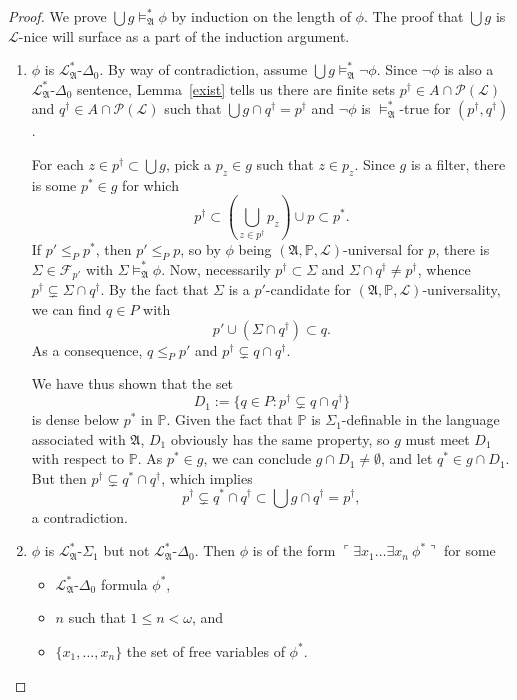 \documentclass[12pt, twoside]{memoir}
\numberwithin{equation}{section}
\theoremstyle{definition}
\theoremstyle{remark}
\theoremstyle{definition}
\theoremstyle{definition}
\theoremstyle{definition}
\theoremstyle{remark}
\begin{document}
\begin{proof}
We prove $\bigcup g \models^{*}_{\mathfrak{A}} \phi$ by induction on the length of $\phi$. The proof that $\bigcup g$ is $\mathcal{L}$-nice will surface as a part of the induction argument.
\begin{enumerate}[label=Case \arabic*:, leftmargin=50pt]
    \item\label{526c1} $\phi$ is $\mathcal{L}^{*}_{\mathfrak{A}}$-$\Delta_0$. By way of contradiction, assume $\bigcup g \models^{*}_{\mathfrak{A}} \neg \phi$. Since $\neg \phi$ is also a $\mathcal{L}^{*}_{\mathfrak{A}}$-$\Delta_0$ sentence, Lemma~\ref{exist} tells us there are finite sets $p^{\dagger} \in A \cap \mathcal{P}(\mathcal{L})$ and $q^{\dagger} \in A \cap \mathcal{P}(\mathcal{L})$ such that $\bigcup g \cap q^{\dagger} = p^{\dagger}$ and $\neg \phi$ is $\models^{*}_{\mathfrak{A}}$-true for $(p^{\dagger}, q^{\dagger})$.

    For each $z \in p^{\dagger} \subset \bigcup g$, pick a $p_z \in g$ such that $z \in p_z$. Since $g$ is a filter, there is some $p^* \in g$ for which $$p^{\dagger} \subset (\bigcup_{z \in p^{\dagger}} p_z) \cup p \subset p^*.$$ If $p' \leq_{P} p^*$, then $p' \leq_{P} p$, so by $\phi$ being $(\mathfrak{A}, \mathbb{P}, \mathcal{L})$-universal for $p$, there is $\Sigma \in \mathcal{F}_{p'}$ with $\Sigma \models^*_{\mathfrak{A}} \phi$. Now, necessarily $p^{\dagger} \subset \Sigma$ and $\Sigma \cap q^{\dagger} \neq p^{\dagger}$, whence $p^{\dagger} \subsetneq \Sigma \cap q^{\dagger}$. By the fact that $\Sigma$ is a $p'$-candidate for $(\mathfrak{A}, \mathbb{P}, \mathcal{L})$-universality, we can find $q \in P$ with $$p' \cup (\Sigma \cap q^{\dagger}) \subset q.$$ As a consequence, $q \leq_P p'$ and $p^{\dagger} \subsetneq q \cap q^{\dagger}$.
    
    We have thus shown that the set $$D_1 := \{q \in P : p^{\dagger} \subsetneq q \cap q^{\dagger}\}$$ is dense below $p^*$ in $\mathbb{P}$. Given the fact that $\mathbb{P}$ is $\Sigma_1$-definable in the language associated with $\mathfrak{A}$, $D_1$ obviously has the same property, so $g$ must meet $D_1$ with respect to $\mathbb{P}$. As $p^* \in g$, we can conclude $g \cap D_1 \neq \emptyset$, and let $q^* \in g \cap D_1$. But then $p^{\dagger} \subsetneq q^* \cap q^{\dagger}$, which implies $$p^{\dagger} \subsetneq q^* \cap q^{\dagger} \subset \bigcup g \cap q^{\dagger} = p^{\dagger},$$ a contradiction. 
    
    \item $\phi$ is $\mathcal{L}^{*}_{\mathfrak{A}}$-$\Sigma_1$ but not $\mathcal{L}^{*}_{\mathfrak{A}}$-$\Delta_0$. Then $\phi$ is of the form $\ulcorner \exists x_1 \dots \exists x_n \ \phi^* \urcorner$ for some 
    \begin{itemize}
        \item $\mathcal{L}^{*}_{\mathfrak{A}}$-$\Delta_0$ formula $\phi^*$,
        \item $n$ such that $1 \leq n < \omega$, and
        \item $\{x_1, \dots, x_n\}$ the set of free variables of $\phi^*$.
    \end{itemize} 
    

\end{enumerate}
\end{proof}
\end{document}
